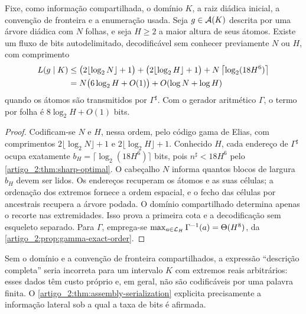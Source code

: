 \begin{theorem}\label{map:artigo_2:3.9}\label{artigo_2:thm:assembly-serialization}
Fixe, como informação compartilhada, o domínio $K$, a raiz diádica inicial,
a convenção de fronteira e a enumeração usada. Seja $g\in\mathcal{A}(K)$ descrita
por uma árvore diádica com $N$ folhas, e seja $H\ge2$ a maior altura de seus
átomos. Existe um fluxo de bits autodelimitado, decodificável sem conhecer
previamente $N$ ou $H$, com comprimento
\begin{align}
 L(g\mid K)
 &\le \bigl(2\lfloor\log_2N\rfloor+1\bigr)
      +\bigl(2\lfloor\log_2H\rfloor+1\bigr)
      +N\left\lceil\log_2(18H^6)\right\rceil \notag\\
 &=N\bigl(6\log_2H+O(1)\bigr)+O(\log N+\log H)
 \label{artigo_2:eq:assembly-bitrate}
\end{align}
quando os átomos são transmitidos por $\Gamma^\sharp$. Com o gerador
aritmético $\Gamma$, o termo por folha é $8\log_2H+O(1)$ bits.
\end{theorem}

\begin{proof}
Codificam-se $N$ e $H$, nessa ordem, pelo código gama de Elias, com comprimentos
$2\lfloor\log_2N\rfloor+1$ e
$2\lfloor\log_2H\rfloor+1$. Conhecido $H$, cada endereço de $\Gamma^\sharp$
ocupa exatamente
$b_H=\lceil\log_2(18H^6)\rceil$ bits, pois
$n^\sharp<18H^6$ pelo \cref{artigo_2:thm:sharp-optimal}. O cabeçalho $N$ informa
quantos blocos de largura $b_H$ devem ser lidos. Os endereços recuperam os
átomos e as suas células; a ordenação dos extremos fornece a ordem espacial, e o fecho
das células por ancestrais recupera a árvore podada. O domínio compartilhado
determina apenas o recorte nas extremidades. Isso prova a primeira cota e a
decodificação sem esqueleto separado. Para $\Gamma$, emprega-se
$\max_{a\in\mathcal{L}_H}\Gamma^{-1}(a)=\Theta(H^8)$, da
\cref{artigo_2:prop:gamma-exact-order}.
\end{proof}

\begin{remark}\label{map:artigo_2:3.10}
Sem o domínio e a convenção de fronteira compartilhados, a expressão
``descrição completa'' seria incorreta para um intervalo $K$ com extremos
reais arbitrários: esses dados têm custo próprio e, em
geral, não são codificáveis por uma palavra finita. O \cref{artigo_2:thm:assembly-serialization} explicita
precisamente a informação lateral sob a qual a taxa de bits é afirmada.
\end{remark}

